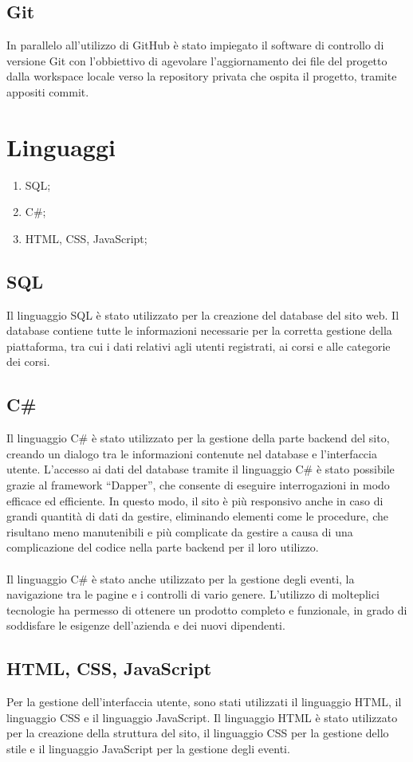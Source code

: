 \subsection{Git}\label{sec:cap_sec_subsec}
In parallelo all'utilizzo di GitHub è stato impiegato il software di controllo di versione Git 
con l'obbiettivo di agevolare l'aggiornamento dei file del progetto dalla workspace locale verso 
la repository privata che ospita il progetto, tramite appositi commit.
\section{Linguaggi}\label{sec:cap_sec_subsec}
\begin{enumerate}
    \item SQL;
    \item C\#;
    \item HTML, CSS, JavaScript;
\end{enumerate}
%
\subsection{SQL}\label{sec:cap_sec_subsec}
Il linguaggio SQL è stato utilizzato per 
la creazione del database del sito web. Il database contiene tutte le informazioni 
necessarie per la corretta gestione della piattaforma, tra cui i dati relativi agli utenti 
registrati, ai corsi e alle categorie dei corsi.
%
\subsection{C\#}\label{sec:cap_sec_subsec}
Il linguaggio C\# è stato utilizzato per la gestione della parte backend del sito, 
creando un dialogo tra le informazioni contenute nel database e l'interfaccia utente. 
L'accesso ai dati del database tramite il linguaggio C\# è stato possibile grazie 
al framework ``Dapper'', che consente di eseguire interrogazioni in modo efficace ed 
efficiente. In questo modo, il sito è più responsivo anche in caso di grandi quantità di 
dati da gestire, eliminando elementi come le procedure, che risultano meno 
manutenibili e più complicate da gestire a causa di una complicazione del codice nella 
parte backend per il loro utilizzo. 
\\ \\
Il linguaggio C\# è stato anche utilizzato per la 
gestione degli eventi, la navigazione tra le pagine e i controlli di vario genere.
L'utilizzo di molteplici 
tecnologie ha permesso di ottenere un prodotto completo e funzionale, in grado di 
soddisfare le esigenze dell'azienda e dei nuovi dipendenti.
%
\subsection{HTML, CSS, JavaScript}\label{sec:cap_sec_subsec}
Per la gestione dell'interfaccia utente, sono stati utilizzati il linguaggio HTML, il 
linguaggio CSS e il linguaggio JavaScript. Il linguaggio HTML è stato utilizzato per la 
creazione della struttura del sito, il linguaggio CSS per la gestione dello stile e il 
linguaggio JavaScript per la gestione degli eventi.